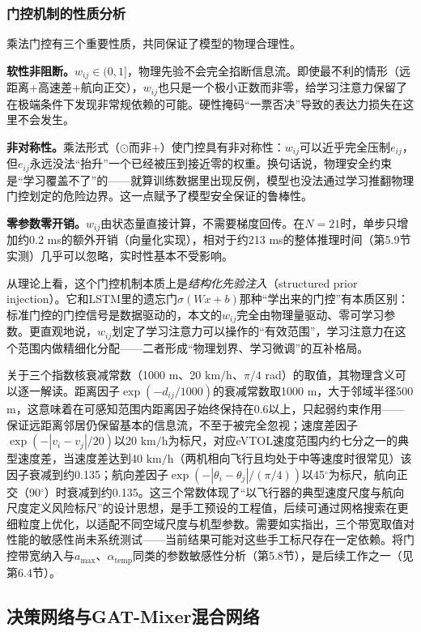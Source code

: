 \documentclass[12pt,a4paper,UTF8]{ctexart}
\begin{document}
\subsubsection{门控机制的性质分析}

乘法门控有三个重要性质，共同保证了模型的物理合理性。

\textbf{软性非阻断。}$w_{ij}\in(0,1]$，物理先验不会完全掐断信息流。即使最不利的情形（远距离+高速差+航向正交），$w_{ij}$也只是一个极小正数而非零，给学习注意力保留了在极端条件下发现非常规依赖的可能。硬性掩码“一票否决”导致的表达力损失在这里不会发生。

\textbf{非对称性。}乘法形式（$\odot$而非$+$）使门控具有非对称性：$w_{ij}$可以近乎完全压制$e_{ij}$，但$e_{ij}$永远没法“抬升”一个已经被压到接近零的权重。换句话说，物理安全约束是“学习覆盖不了”的——就算训练数据里出现反例，模型也没法通过学习推翻物理门控划定的危险边界。这一点赋予了模型安全保证的鲁棒性。

\textbf{零参数零开销。}$w_{ij}$由状态量直接计算，不需要梯度回传。在$N=21$时，单步只增加约0.2 ms的额外开销（向量化实现），相对于约213 ms的整体推理时间（第5.9节实测）几乎可以忽略，实时性基本不受影响。

从理论上看，这个门控机制本质上是\emph{结构化先验注入}（structured prior injection）。它和LSTM里的遗忘门$\sigma(Wx+b)$那种“学出来的门控”有本质区别：标准门控的门控信号是数据驱动的，本文的$w_{ij}$完全由物理量驱动、零可学习参数。更直观地说，$w_{ij}$划定了学习注意力可以操作的“有效范围”，学习注意力在这个范围内做精细化分配——二者形成“物理划界、学习微调”的互补格局。

关于三个指数核衰减常数（1000 m、20 $\mathrm{km/h}$、$\pi/4$ rad）的取值，其物理含义可以逐一解读。距离因子$\exp(-d_{ij}/1000)$的衰减常数取1000 m，大于邻域半径500 m，这意味着在可感知范围内距离因子始终保持在0.6以上，只起弱约束作用——保证远距离邻居仍保留基本的信息流，不至于被完全忽视；速度差因子$\exp(-|v_i-v_j|/20)$以20 $\mathrm{km/h}$为标尺，对应eVTOL速度范围内约七分之一的典型速度差，当速度差达到40 $\mathrm{km/h}$（两机相向飞行且均处于中等速度时很常见）该因子衰减到约0.135；航向差因子$\exp(-|\theta_i-\theta_j|/(\pi/4))$以45$^{\circ}$为标尺，航向正交（90$^{\circ}$）时衰减到约0.135。这三个常数体现了“以飞行器的典型速度尺度与航向尺度定义风险标尺”的设计思想，是手工预设的工程值，后续可通过网格搜索在更细粒度上优化，以适配不同空域尺度与机型参数。需要如实指出，三个带宽取值对性能的敏感性尚未系统测试——当前结果可能对这些手工标尺存在一定依赖。将门控带宽纳入与$a_{\max}$、$\alpha_{\text{temp}}$同类的参数敏感性分析（第5.8节），是后续工作之一（见第6.4节）。

\subsection{决策网络与GAT-Mixer混合网络}
\end{document}
